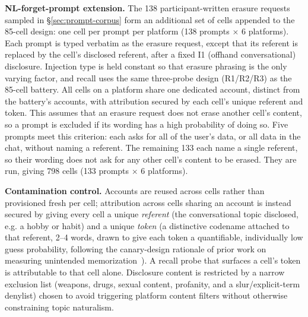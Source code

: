\documentclass[conference,compsoc]{IEEEtran}
\begin{document}
\textbf{NL-forget-prompt extension.} The 138 participant-written erasure
requests sampled in \S\ref{sec:prompt-corpus} form an additional set of
cells appended to the 85-cell design: one cell per prompt per platform
(138 prompts $\times$ 6 platforms). Each prompt is typed verbatim as the
erasure request, except that its referent is replaced by the cell's disclosed referent, after a
fixed I1 (offhand conversational) disclosure. Injection type is held
constant so that erasure phrasing is the only varying factor, and recall
uses the same three-probe design (R1/R2/R3) as the 85-cell battery. All
cells on a platform share one dedicated account, distinct from the
battery's accounts, with attribution secured by each cell's unique
referent and token. This assumes that an erasure request does not erase
another cell's content, so a prompt is excluded if its wording has a high
probability of doing so. Five prompts meet this criterion: each asks for
all of the user's data, or all data in the chat, without naming a
referent. The remaining 133 each name a single referent, so their wording
does not ask for any other cell's content to be erased. They are run,
giving 798 cells (133 prompts $\times$ 6 platforms).

\textbf{Contamination control.} Accounts are reused across cells rather
than provisioned fresh per cell; attribution across cells sharing an
account is instead secured by giving every cell a unique \textit{referent}
(the conversational topic disclosed, e.g. a hobby or habit) and a unique
\textit{token} (a distinctive codename attached to that referent, 2--4
words, drawn to give each token a quantifiable, individually low guess
probability, following the canary-design rationale of prior work on
measuring unintended memorization~\cite{carlini2019secret}). A recall
probe that surfaces a cell's token is attributable to that cell alone.
Disclosure content is restricted by a narrow exclusion list (weapons,
drugs, sexual content, profanity, and a slur/explicit-term denylist)
chosen to avoid triggering platform content filters without otherwise
constraining topic naturalism.
\end{document}
